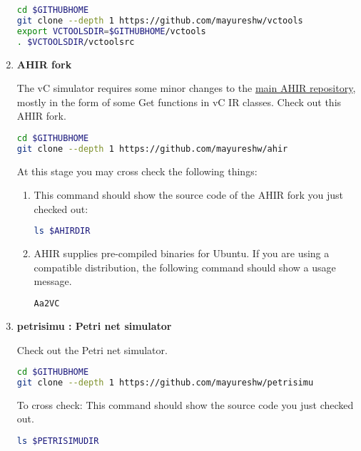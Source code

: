 \documentclass[12pt,a4paper]{article}
\begin{document}
\begin{enumerate}
\begin{lstlisting}[language=bash,style=snippet]
cd $GITHUBHOME
git clone --depth 1 https://github.com/mayureshw/vctools
export VCTOOLSDIR=$GITHUBHOME/vctools
. $VCTOOLSDIR/vctoolsrc
\end{lstlisting}

\item \textbf{AHIR fork}

The vC simulator requires some minor changes to the \href{https://github.com/madhavPdesai/ahir}{main AHIR repository}, mostly in the form of some Get functions in vC IR classes. Check out this AHIR fork.

\begin{lstlisting}[language=bash,style=snippet]
cd $GITHUBHOME
git clone --depth 1 https://github.com/mayureshw/ahir
\end{lstlisting}

At this stage you may cross check the following things:

\begin{enumerate}
\item This command should show the source code of the AHIR fork you just checked out:

\begin{lstlisting}[language=bash,style=snippet]
ls $AHIRDIR
\end{lstlisting}

\item AHIR supplies pre-compiled binaries for Ubuntu. If you are using a compatible distribution, the following command should show a usage message.

\begin{lstlisting}[language=bash,style=snippet]
Aa2VC
\end{lstlisting}

\end{enumerate}

\item \textbf{petrisimu : Petri net simulator}

Check out the Petri net simulator.

\begin{lstlisting}[language=bash,style=snippet]
cd $GITHUBHOME
git clone --depth 1 https://github.com/mayureshw/petrisimu
\end{lstlisting}

To cross check: This command should show the source code you just checked out.

\begin{lstlisting}[language=bash,style=snippet]
ls $PETRISIMUDIR
\end{lstlisting}


\end{enumerate}
\end{document}

